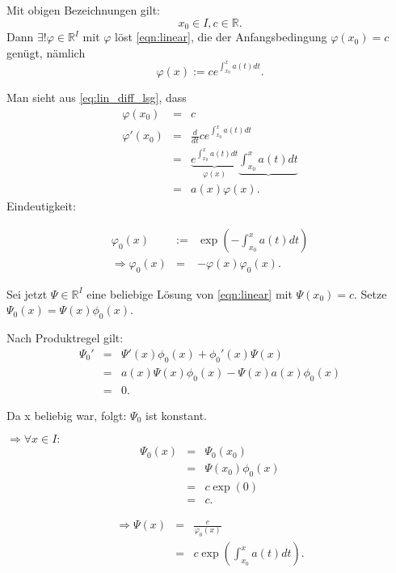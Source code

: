 \documentclass[10pt]{scrbook}
\begin{document}
\begin{Sa}
Mit obigen Bezeichnungen gilt:
\begin{displaymath}
x_0\in I, c\in\mathbb{R}.
\end{displaymath}
Dann $\exists !\varphi \in \mathbb{R}^I$ mit $\varphi$ löst \eqref{eqn:linear}, die der Anfangsbedingung $\varphi(x_0)=c$ genügt, nämlich
\begin{equation}
\varphi(x) := c e^{\int_{x_0}^x a(t) dt}. \label{eq:lin_diff_lsg}
\end{equation}
\end{Sa}
\begin{bew}
Man sieht aus \eqref{eq:lin_diff_lsg}, dass
\begin{eqnarray*}
\varphi(x_0) & = & c \\
\varphi'(x_0) & = & \frac{d}{dt} c e^{\int_{x_0}^x a(t) dt} \\
& = & \underbrace{e^{\int_{x_0}^x a(t) dt}}_{\varphi(x)} \underbrace{\int_{x_0}^x a(t) dt}_{} \\
& = & a(x) \varphi(x).
\end{eqnarray*}
Eindeutigkeit:

\begin{eqnarray*}
\varphi_0(x) & := & \exp(-\int_{x_0}^x a(t) dt) \\
\Rightarrow \varphi_0(x) & = & -\varphi(x)\varphi_0(x).
\end{eqnarray*}

Sei jetzt $\Psi \in\mathbb{R}^I$ eine beliebige Lösung von \eqref{eqn:linear} mit $\Psi(x_0)=c$. Setze $\Psi_0(x)=\Psi(x)\phi_0(x)$.

Nach Produktregel gilt:
\begin{eqnarray*}
\Psi_0' & = & \Psi'(x) \phi_0(x)+\phi_0'(x) \Psi(x) \\
& = & a(x) \Psi(x) \phi_0(x)-\Psi(x)a(x) \phi_0(x) \\
& = & 0.
\end{eqnarray*}

Da x beliebig war, folgt: $\Psi_0$ ist konstant.

$\Rightarrow \forall x\in I:$
\begin{eqnarray*}
\Psi_0(x) & = & \Psi_0(x_0) \\
& = & \Psi(x_0)\phi_0(x) \\
& = & c \exp(0) \\
& = & c.
\end{eqnarray*}

\begin{eqnarray*}
\Rightarrow \Psi(x) & = & \frac{c}{\varphi_0(x)} \\
& = & c \exp(\int_{x_0}^x a(t) dt).
\end{eqnarray*}
\end{bew}
\end{document}
